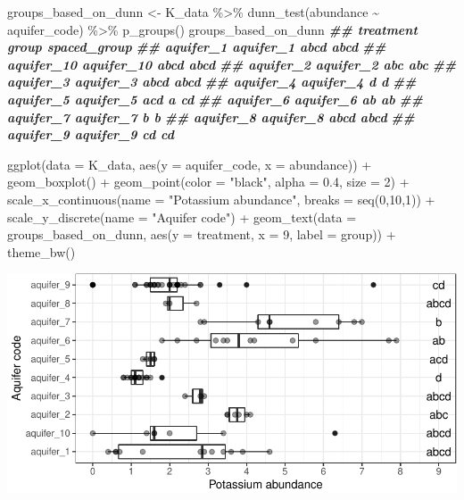 \documentclass[
]{krantz}
\newenvironment{Shaded}{\begin{snugshade}}{\end{snugshade}}
\newcommand{\AttributeTok}[1]{\textcolor[rgb]{0.77,0.63,0.00}{#1}}
\newcommand{\DecValTok}[1]{\textcolor[rgb]{0.00,0.00,0.81}{#1}}
\newcommand{\DocumentationTok}[1]{\textcolor[rgb]{0.56,0.35,0.01}{\textbf{\textit{#1}}}}
\newcommand{\FloatTok}[1]{\textcolor[rgb]{0.00,0.00,0.81}{#1}}
\newcommand{\FunctionTok}[1]{\textcolor[rgb]{0.00,0.00,0.00}{#1}}
\newcommand{\NormalTok}[1]{#1}
\newcommand{\OtherTok}[1]{\textcolor[rgb]{0.56,0.35,0.01}{#1}}
\newcommand{\SpecialCharTok}[1]{\textcolor[rgb]{0.00,0.00,0.00}{#1}}
\newcommand{\StringTok}[1]{\textcolor[rgb]{0.31,0.60,0.02}{#1}}
\begin{document}
\begin{Shaded}
\begin{Highlighting}[]
\NormalTok{groups\_based\_on\_dunn }\OtherTok{\textless{}{-}}\NormalTok{ K\_data }\SpecialCharTok{\%\textgreater{}\%}
  \FunctionTok{dunn\_test}\NormalTok{(abundance }\SpecialCharTok{\textasciitilde{}}\NormalTok{ aquifer\_code) }\SpecialCharTok{\%\textgreater{}\%}
  \FunctionTok{p\_groups}\NormalTok{()}
\NormalTok{groups\_based\_on\_dunn}
\DocumentationTok{\#\#             treatment group spaced\_group}
\DocumentationTok{\#\# aquifer\_1   aquifer\_1  abcd         abcd}
\DocumentationTok{\#\# aquifer\_10 aquifer\_10  abcd         abcd}
\DocumentationTok{\#\# aquifer\_2   aquifer\_2   abc         abc }
\DocumentationTok{\#\# aquifer\_3   aquifer\_3  abcd         abcd}
\DocumentationTok{\#\# aquifer\_4   aquifer\_4     d            d}
\DocumentationTok{\#\# aquifer\_5   aquifer\_5   acd         a cd}
\DocumentationTok{\#\# aquifer\_6   aquifer\_6    ab         ab  }
\DocumentationTok{\#\# aquifer\_7   aquifer\_7     b          b  }
\DocumentationTok{\#\# aquifer\_8   aquifer\_8  abcd         abcd}
\DocumentationTok{\#\# aquifer\_9   aquifer\_9    cd           cd}

\FunctionTok{ggplot}\NormalTok{(}\AttributeTok{data =}\NormalTok{ K\_data, }\FunctionTok{aes}\NormalTok{(}\AttributeTok{y =}\NormalTok{ aquifer\_code, }\AttributeTok{x =}\NormalTok{ abundance)) }\SpecialCharTok{+}
  \FunctionTok{geom\_boxplot}\NormalTok{() }\SpecialCharTok{+}
  \FunctionTok{geom\_point}\NormalTok{(}\AttributeTok{color =} \StringTok{"black"}\NormalTok{, }\AttributeTok{alpha =} \FloatTok{0.4}\NormalTok{, }\AttributeTok{size =} \DecValTok{2}\NormalTok{) }\SpecialCharTok{+}
  \FunctionTok{scale\_x\_continuous}\NormalTok{(}\AttributeTok{name =} \StringTok{"Potassium abundance"}\NormalTok{, }\AttributeTok{breaks =} \FunctionTok{seq}\NormalTok{(}\DecValTok{0}\NormalTok{,}\DecValTok{10}\NormalTok{,}\DecValTok{1}\NormalTok{)) }\SpecialCharTok{+}
  \FunctionTok{scale\_y\_discrete}\NormalTok{(}\AttributeTok{name =} \StringTok{"Aquifer code"}\NormalTok{) }\SpecialCharTok{+}
  \FunctionTok{geom\_text}\NormalTok{(}\AttributeTok{data =}\NormalTok{ groups\_based\_on\_dunn, }\FunctionTok{aes}\NormalTok{(}\AttributeTok{y =}\NormalTok{ treatment, }\AttributeTok{x =} \DecValTok{9}\NormalTok{, }\AttributeTok{label =}\NormalTok{ group)) }\SpecialCharTok{+}
  \FunctionTok{theme\_bw}\NormalTok{()}
\end{Highlighting}
\end{Shaded}

\begin{center}\includegraphics[width=0.8\linewidth]{index_files/figure-latex/unnamed-chunk-153-1} \end{center}
\end{document}
